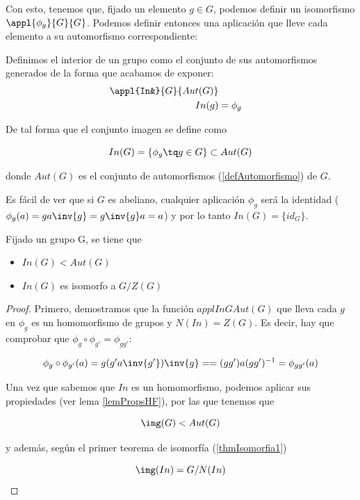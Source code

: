 \documentclass[nochap]{apuntes}
\begin{document}
Con esto, tenemos que, fijado un elemento $g\in G$, podemos definir un isomorfismo $\appl{\phi _g}{G}{G}$. Podemos definir entonces una aplicación que lleve cada elemento a su automorfismo correspondiente:  

\begin{defn} Definimos el interior de un grupo como el conjunto de sus automorfismos generados de la forma que acabamos de exponer:
\begin{align*}
 \appl{In&}{G}{Aut(G)} \\
 In(g) &= \phi_g
 \end{align*}
 
 De tal forma que el conjunto imagen se define como
 
\[ In(G) = \{ \phi_g \tq g\in G\} \subset Aut(G) \]

donde $Aut(G)$ es el conjunto de automorfismos (\ref{defAutomorfismo}) de $G$.
\end{defn}

Es fácil de ver que si $G$ es abeliano, cualquier aplicación $\phi_g$ será la identidad ($\phi_g(a) = g a \inv{g} = g\inv{g}a = a$) y por lo tanto $In(G) = \{ id_G \}$.

\begin{theorem}
Fijado un grupo G, se tiene que
\begin{itemize}
\item $In(G) < Aut(G)$
\item $In(G)$ es isomorfo a $G/Z(G)$
\end{itemize}
\end{theorem}

\begin{proof}
Primero, demostramos que la función $appl{In}{G}{Aut(G)}$ que lleva cada $g$ en $\phi _g$ es un homomorfismo de grupos y $N(In) = Z(G)$. Es decir, hay que comprobar que $\phi_g\circ \phi_{g'} = \phi_{gg'}$:

\[ \phi _g \circ \phi _{g'} (a) = g(g'a\inv{g'})\inv{g} == (gg')a(gg')^{-1} = \phi_{gg'} (a) \]
 
 Una vez que sabemos que $In$ es un homomorfismo, podemos aplicar sus propiedades (ver lema \ref{lemPropsHF}), por las que tenemos que
 
 \[ \img(G) < Aut(G) \]

y además, según el primer teorema de isomorfía (\ref{thmIsomorfia1}) 

\[ \img(In) = G/N(In) \]
\end{proof}
\end{document}
